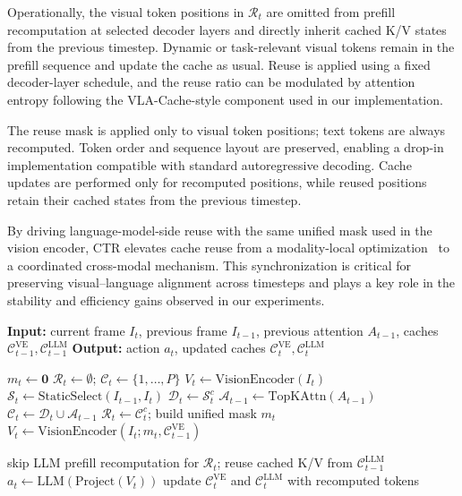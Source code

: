 \documentclass[11pt]{article}
\begin{document}
Operationally, the visual token positions in $\mathcal{R}_t$ are omitted from prefill recomputation at selected decoder layers and directly inherit cached K/V states from the previous timestep.
Dynamic or task-relevant visual tokens remain in the prefill sequence and update the cache as usual.
Reuse is applied using a fixed decoder-layer schedule, and the reuse ratio can be modulated by attention entropy following the VLA-Cache-style component used in our implementation.

The reuse mask is applied only to visual token positions; text tokens are always recomputed.
Token order and sequence layout are preserved, enabling a drop-in implementation compatible with standard autoregressive decoding.
Cache updates are performed only for recomputed positions, while reused positions retain their cached states from the previous timestep.

By driving language-model-side reuse with the same unified mask used in the vision encoder, CTR elevates cache reuse from a modality-local optimization~\citep{xu2025vla} to a coordinated cross-modal mechanism.
This synchronization is critical for preserving visual--language alignment across timesteps and plays a key role in the stability and efficiency gains observed in our experiments.


\begin{algorithm}[t]
\caption{Coordinated Token Reuse with a Unified Mask}
\label{alg:dual_cache}
\begin{algorithmic}
\STATE \textbf{Input:} current frame $I_t$, previous frame $I_{t-1}$, previous attention $A_{t-1}$, caches $\mathcal{C}^{\text{VE}}_{t-1}, \mathcal{C}^{\text{LLM}}_{t-1}$
\STATE \textbf{Output:} action $a_t$, updated caches $\mathcal{C}^{\text{VE}}_{t}, \mathcal{C}^{\text{LLM}}_{t}$

    \STATE $m_t \leftarrow \mathbf{0}$ 
    \STATE $\mathcal{R}_t \leftarrow \emptyset$; $\mathcal{C}_t \leftarrow \{1,\ldots,P\}$
    \STATE $V_t \leftarrow \text{VisionEncoder}(I_t)$
\ELSE
    \STATE $\mathcal{S}_t \leftarrow \text{StaticSelect}(I_{t-1}, I_t)$ 
    \STATE $\mathcal{D}_t \leftarrow \mathcal{S}_t^{c}$ 
    \STATE $\mathcal{A}_{t-1} \leftarrow \text{TopKAttn}(A_{t-1})$ 
    \STATE $\mathcal{C}_t \leftarrow \mathcal{D}_t \cup \mathcal{A}_{t-1}$ 
    \STATE $\mathcal{R}_t \leftarrow \mathcal{C}_t^{c}$; build unified mask $m_t$
    \STATE $V_t \leftarrow \text{VisionEncoder}(I_t; m_t, \mathcal{C}^{\text{VE}}_{t-1})$ 
\ENDIF

\STATE skip LLM prefill recomputation for $\mathcal{R}_t$; reuse cached K/V from $\mathcal{C}^{\text{LLM}}_{t-1}$
\STATE $a_t \leftarrow \text{LLM}(\text{Project}(V_t))$
\STATE update $\mathcal{C}^{\text{VE}}_{t}$ and $\mathcal{C}^{\text{LLM}}_{t}$ with recomputed tokens
\end{algorithmic}
\end{algorithm}
\end{document}
